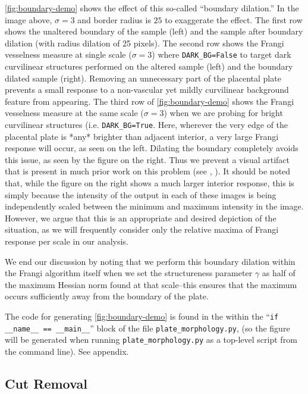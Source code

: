     \cref{fig:boundary-demo} shows the effect of this so-called ``boundary dilation.'' 
    In the image above, $\sigma=3$ and border radius is $25$ to exaggerate the effect.
    The first row shows the unaltered boundary of the sample (left) and
        the sample after boundary dilation (with radius dilation of 25 pixels).
    The second row shows the Frangi vesselness measure at single scale ($\sigma=3$) where \texttt{DARK\_BG=False} to target dark curvilinear structures performed on the altered sample (left) and the boundary dilated sample (right). Removing an unnecessary part of
    the placental plate prevents a small response to a non-vascular yet mildly curvilinear
    background feature from appearing.
    The third row of \cref{fig:boundary-demo} shows the Frangi vesselness measure at the same scale ($\sigma=3$) when we are probing for bright curvilinear structures (i.e.
    \texttt{DARK\_BG=True}. Here, wherever the very edge of the placental plate is *any* brighter than adjacent interior, a very large Frangi response will occur, as seen on the left. Dilating the boundary completely avoids this issue, as seen by the figure on the right. Thus we prevent a visual artifact that is present in much prior work on this problem (see \cite{huynh2013filter}, \cite{almoussa-ucla-reu}).
    It should be noted that, while the figure on the right shows a much larger interior response, this is simply because the intensity of the output in each of these
    images is being independently scaled between the minimum and maximum intensity in the image. However, we argue that this is an appropriate and desired depiction of the situation, as we will frequently consider only the relative maxima of Frangi response per scale in our analysis.
    
    We end our discussion by noting that we perform this boundary dilation within the
    Frangi algorithm itself when we set the structureness parameter $\gamma$ as half of the maximum Hessian norm found at that scale--this ensures that the maximum occurs sufficiently away from the boundary of the plate.
    
    The code for generating \cref{fig:boundary-demo} is found in the within the ``\texttt{if \_\_name\_\_ == \_\_main\_\_}'' block of the file \texttt{plate\_morphology.py},
    (so the figure will be generated when running \texttt{plate\_morphology.py} as a top-level script from the command line). See appendix.
    
    \subsection{Cut Removal}
    

